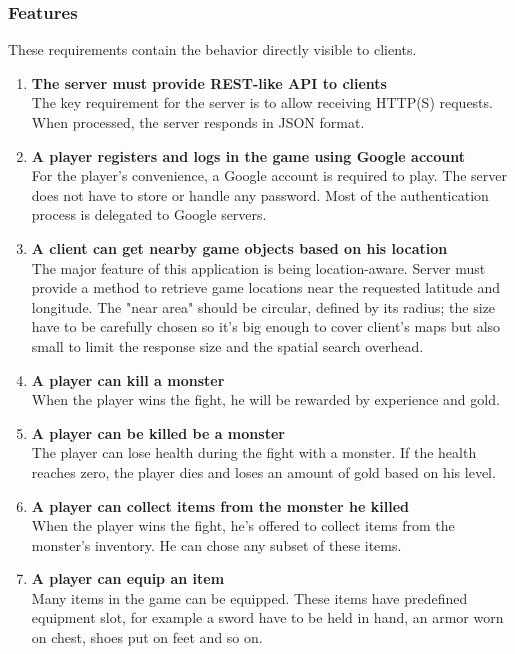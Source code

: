 		\subsubsection*{Features}
		These requirements contain the behavior directly visible to clients.
		\begin{enumerate}
			\item \textbf{The server must provide REST-like API to clients} \\
			The key requirement for the server is to allow receiving HTTP(S) requests. When processed, the server responds in JSON format.
			
			\item \textbf{A player registers and logs in the game using Google account} \\
			For the player's convenience, a Google account is required to play. The server does not have to store or handle any password. Most of the authentication process is delegated to Google servers.
			
			\item \textbf{A client can get nearby game objects based on his location} \\
			The major feature of this application is being location-aware. Server must provide a method to retrieve game locations near the requested latitude and longitude. The "near area" should be circular, defined by its radius; the size have to be carefully chosen so it's big enough to cover client's maps but also small to limit the response size and the spatial search overhead.
			
			\item \textbf{A player can kill a monster} \\
			When the player wins the fight, he will be rewarded by experience and gold. 			
			
			\item \textbf{A player can be killed be a monster} \\
			The player can lose health during the fight with a monster. If the health reaches zero, the player dies and loses an amount of gold based on his level.
			
			\item \textbf{A player can collect items from the monster he killed} \\
			When the player wins the fight, he's offered to collect items from the monster's inventory. He can chose any subset of these items.
			
			\item \textbf{A player can equip an item} \\	
			Many items in the game can be equipped. These items have predefined equipment slot, for example a sword have to be held in hand, an armor worn on chest, shoes put on feet and so on.
						

\end{enumerate}
